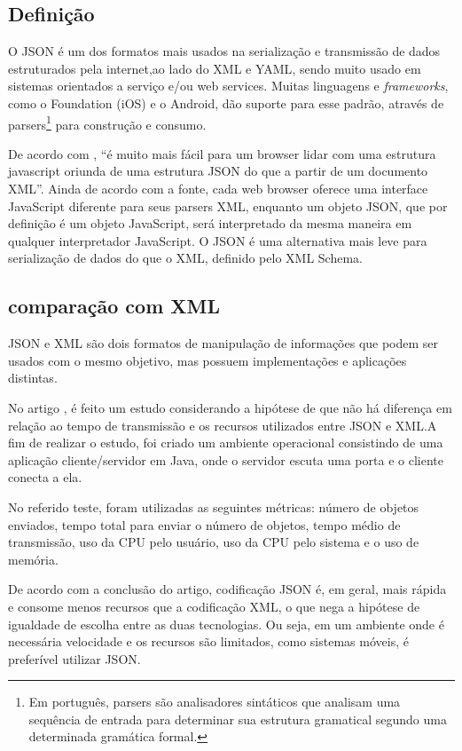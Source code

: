 \subsection{Definição}
	O \ac{JSON} é um dos formatos mais usados na serialização e transmissão de dados estruturados pela internet,ao lado do \ac{XML} e \ac{YAML}, sendo muito usado em sistemas orientados a serviço e/ou web services. Muitas linguagens e \emph{frameworks}, como o Foundation (iOS) e o Android, dão suporte para esse padrão, através de parsers\footnote{Em português, parsers são analisadores sintáticos que analisam uma sequência de entrada para determinar sua estrutura gramatical segundo uma determinada gramática formal.} para construção e consumo.
	
De acordo com \cite{restfulws}, ``é muito mais fácil para um browser lidar com uma estrutura javascript oriunda de uma estrutura \ac{JSON} do que a partir de um documento \ac{XML}''. Ainda de acordo com a fonte, cada web browser oferece uma interface JavaScript diferente para seus parsers \ac{XML}, enquanto um objeto \ac{JSON}, que por definição é um objeto JavaScript, será interpretado da mesma maneira em qualquer interpretador JavaScript. O \ac{JSON} é uma alternativa mais leve para serialização de dados do que o \ac{XML}, definido pelo \ac{XML} Schema. 

\subsection{comparação com XML}
	\ac{JSON} e \ac{XML} são dois formatos de manipulação de informações que podem ser usados com o mesmo objetivo, mas possuem implementações e aplicações distintas. 

	No artigo \cite{comparexmljson}, é feito um estudo considerando a hipótese de que não há diferença em relação ao tempo de transmissão e os recursos utilizados entre \ac{JSON} e \ac{XML}.A fim de realizar o estudo, foi criado um ambiente operacional consistindo de uma aplicação cliente/servidor em Java, onde o servidor escuta uma porta e o cliente conecta a ela. 

	No referido teste, foram utilizadas as seguintes métricas: número de objetos enviados, tempo total para enviar o número de objetos, tempo médio de transmissão, uso da CPU pelo usuário, uso da CPU pelo sistema e o uso de memória.

	De acordo com a conclusão do artigo, codificação \ac{JSON} é, em geral, mais rápida e consome menos recursos que a codificação \ac{XML}, o que nega a hipótese de igualdade de escolha entre as duas tecnologias. Ou seja, em um ambiente onde é necessária velocidade e os recursos são limitados, como sistemas móveis, é preferível utilizar \ac{JSON}.


